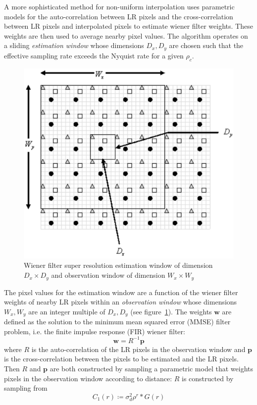 A more sophisticated method for non-uniform interpolation uses parametric models for the auto-correlation between LR pixels and the cross-correlation between LR pixels and interpolated pixels to estimate wiener filter weights\cite{wiener}.
%
These weights are then used to average nearby pixel values.
%
The algorithm operates on a sliding \textit{estimation window} whose dimensions $D_x, D_y$ are chosen such that the effective sampling rate exceeds the Nyquist rate for a given $\rho_c$.
\begin{figure}
    \centering
    \includegraphics[width=.7\linewidth]{figures/wiener.png}
    \caption{Wiener filter super resolution estimation window of dimension $D_x \times D_y$ and observation window of dimension $W_x \times W_y$\cite{wiener}}
    \label{fig:wiener}
\end{figure}
The pixel values for the estimation window are a function of the wiener filter weights of nearby LR pixels within an \textit{observation window} whose dimensions $W_x, W_y$ are an integer multiple of $D_x, D_y$ (see figure~\ref{fig:wiener}).
%
The weights $\bm{w}$ are defined as the solution to the minimum mean squared error (MMSE) filter problem, i.e. the finite impulse response (FIR) wiener filter:
\begin{equation}
    \bm{w} = R^{-1}\bm{p}
\end{equation}
where $R$ is the auto-correlation of the LR pixels in the observation window and $\bm{p}$ is the cross-correlation between the pixels to be estimated and the LR pixels.
%
Then $R$ and $\bm{p}$ are both constructed by sampling a parametric model that weights pixels in the observation window according to distance:
%
$R$ is constructed by sampling from
\begin{equation}
    C_1(r) \coloneqq \sigma_{d}^2 \rho^{r} \ast G(r)
\end{equation}
